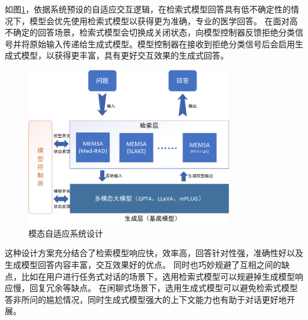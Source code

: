如图\ref{sys_model}，依据系统预设的自适应交互逻辑，在检索式模型回答具有低不确定性的情况下，模型会优先使用检索式模型以获得更为准确，专业的医学回答。
在面对高不确定的回答场景，检索式模型会切换成关闭状态，向模型控制器反馈拒绝分类信号并将原始输入传递给生成式模型。模型控制器在接收到拒绝分类信号后会启用生成式模型，以获得更丰富，具有更好交互效果的生成式回答。
\begin{figure}[htbp]
	\centering	
	\includegraphics[width=0.8\textwidth]{Fig/myfig/chapter5/sys_model.png}  %
	\caption{\label{sys_model}模态自适应系统设计} 
\end{figure}

这种设计方案充分结合了检索模型响应快，效率高，回答针对性强，准确性好以及生成模型回答内容丰富，交互效果好的优点。
同时也巧妙规避了互相之间的缺点，比如在用户进行任务式对话的场景下，选用检索式模型可以规避掉生成模型响应慢，回复冗余等缺点。
在闲聊式场景下，选用生成式模型可以避免检索式模型答非所问的尴尬情况，同时生成式模型强大的上下文能力也有助于对话更好地开展。

